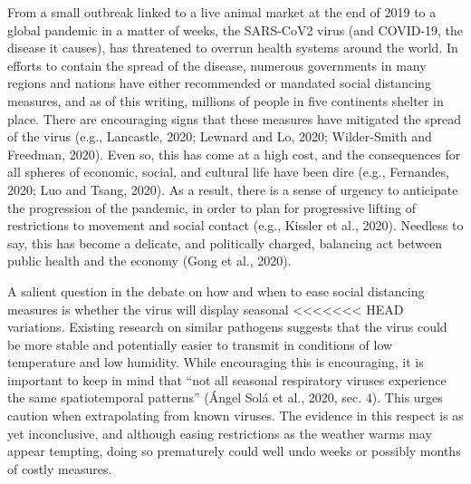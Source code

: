 \documentclass[]{elsarticle} %
\begin{document}
From a small outbreak linked to a live animal market at the end of 2019
to a global pandemic in a matter of weeks, the SARS-CoV2 virus (and
COVID-19, the disease it causes), has threatened to overrun health
systems around the world. In efforts to contain the spread of the
disease, numerous governments in many regions and nations have either
recommended or mandated social distancing measures, and as of this
writing, millions of people in five continents shelter in place. There
are encouraging signs that these measures have mitigated the spread of
the virus (e.g., Lancastle, 2020; Lewnard and Lo, 2020; Wilder-Smith and
Freedman, 2020). Even so, this has come at a high cost, and the
consequences for all spheres of economic, social, and cultural life have
been dire (e.g., Fernandes, 2020; Luo and Tsang, 2020). As a result,
there is a sense of urgency to anticipate the progression of the
pandemic, in order to plan for progressive lifting of restrictions to
movement and social contact (e.g., Kissler et al., 2020). Needless to
say, this has become a delicate, and politically charged, balancing act
between public health and the economy (Gong et al., 2020).

A salient question in the debate on how and when to ease social
distancing measures is whether the virus will display seasonal
<<<<<<< HEAD
variations. Existing research on similar pathogens suggests that the
virus could be more stable and potentially easier to transmit in
conditions of low temperature and low humidity. While encouraging this
is encouraging, it is important to keep in mind that ``not all seasonal
respiratory viruses experience the same spatiotemporal patterns'' (Ángel
Solá et al., 2020, sec. 4). This urges caution when extrapolating from
known viruses. The evidence in this respect is as yet inconclusive, and
although easing restrictions as the weather warms may appear tempting,
doing so prematurely could well undo weeks or possibly months of costly
measures.
\end{document}
